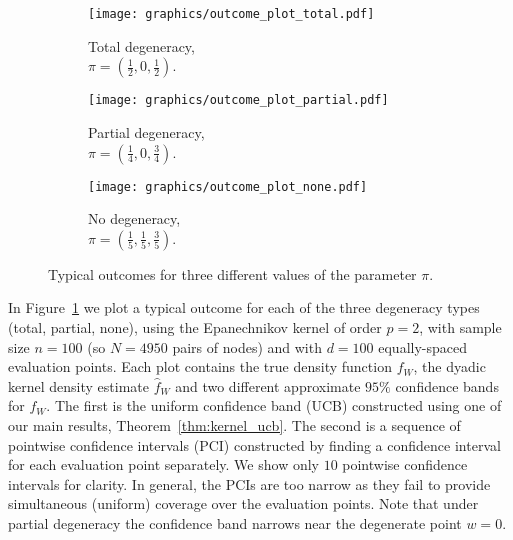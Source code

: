 \documentclass[11pt,lof]{puthesis}
\theoremstyle{break}
\theoremstyle{proof}
\begin{document}
\begin{figure}[b!]
\centering
%
\begin{subfigure}{0.32\textwidth}
\centering
\texttt{[image: graphics/outcome\_plot\_total.pdf]}
\caption{Total degeneracy, \\
$\pi = \left( \frac{1}{2}, 0, \frac{1}{2} \right)$.}
\end{subfigure}
%
\begin{subfigure}{0.32\textwidth}
\centering
\texttt{[image: graphics/outcome\_plot\_partial.pdf]}
\caption{Partial degeneracy, \\
$\pi = \left( \frac{1}{4}, 0, \frac{3}{4} \right)$.}
\end{subfigure}
%
\begin{subfigure}{0.32\textwidth}
\centering
\texttt{[image: graphics/outcome\_plot\_none.pdf]}
\caption{No degeneracy, \\
$\pi = \left( \frac{1}{5}, \frac{1}{5}, \frac{3}{5} \right)$.}
\end{subfigure}
%
\caption[Typical outcomes for different values of the parameter $\pi$]
{Typical outcomes for three different values of the parameter $\pi$.}
%
\label{fig:kernel_results}
%
\end{figure}

In Figure~\ref{fig:kernel_results} we plot a typical outcome for each of the
three
degeneracy types (total, partial, none), using the Epanechnikov kernel of order
$p=2$, with sample size $n=100$ (so $N=4950$ pairs of nodes) and with $d=100$
equally-spaced evaluation points. Each plot contains the true density function
$f_W$, the dyadic kernel density estimate $\hat f_W$ and two different
approximate $95\%$ confidence bands for $f_W$. The first is the uniform
confidence band (UCB) constructed using one of our main results,
Theorem~\ref{thm:kernel_ucb}. The second is a sequence of pointwise confidence
intervals (PCI) constructed by finding a confidence interval for each
evaluation point separately. We show only $10$ pointwise confidence intervals
for clarity. In general, the PCIs are too narrow as they fail to provide
simultaneous (uniform) coverage over the evaluation points. Note that under
partial degeneracy the confidence band narrows near the degenerate point
$w = 0$.
\end{document}
